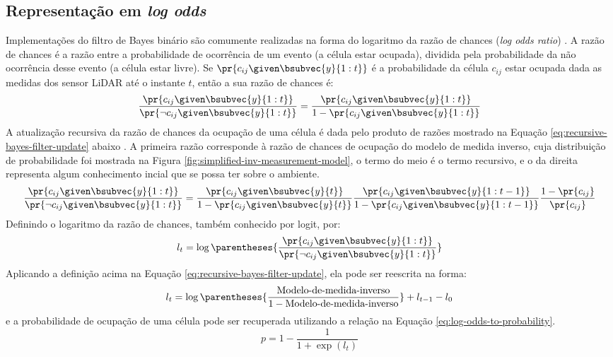 \subsection{Representação em \textit{log odds}}
Implementações do filtro de Bayes binário são comumente realizadas na 
forma do logaritmo da razão de chances (\textit{log odds ratio}) \cite[p.~94]{thrun2005probabilistic}. A razão de chances é a 
razão entre a probabilidade de ocorrência de um evento (a célula 
estar ocupada), dividida pela probabilidade da não ocorrência desse evento (a 
célula estar livre). Se $\pr{c_{ij} \given \bsubvec{y}{1:t}}$ é a probabilidade da célula $c_{ij}$ 
estar ocupada dada as medidas dos sensor LiDAR até o instante $t$, então a sua razão de chances é:
\begin{equation}
  \frac{\pr{c_{ij}\given \bsubvec{y}{1:t}}}{\pr{\neg c_{ij}\given \bsubvec{y}{1:t}}} = \frac{\pr{c_{ij}\given \bsubvec{y}{1:t}}}{1 - \pr{c_{ij}\given \bsubvec{y}{1:t}}}
\end{equation}
A atualização recursiva da razão de chances da ocupação de uma célula é 
dada pelo produto de razões mostrado na Equação \ref{eq:recursive-bayes-filter-update} abaixo \cite[p.~96]{thrun2005probabilistic}. A primeira razão corresponde à razão de 
chances de ocupação do modelo de medida inverso, cuja distribuição de 
probabilidade foi mostrada na Figura \ref{fig:simplified-inv-measurement-model}, o termo do meio é o termo 
recursivo, e o da direita representa algum conhecimento incial que se 
possa ter sobre o ambiente.
\begin{equation}
  \frac{\pr{c_{ij}\given \bsubvec{y}{1:t}}}{\pr{\neg c_{ij}\given \bsubvec{y}{1:t}}} = \frac{\pr{c_{ij}\given \bsubvec{y}{t}}}{1 - \pr{c_{ij}\given \bsubvec{y}{t}}} \frac{\pr{c_{ij}\given \bsubvec{y}{1:t-1}}}{1 - \pr{c_{ij}\given \bsubvec{y}{1:t-1}}} \frac{1 - \pr{c_{ij}}}{\pr{c_{ij}}}
  \label{eq:recursive-bayes-filter-update}
\end{equation}
Definindo o logaritmo da razão de chances, também conhecido por logit, por:
\begin{equation}
  l_{t} = \log\parentheses{\frac{\pr{c_{ij}\given \bsubvec{y}{1:t}}}{\pr{\neg c_{ij}\given \bsubvec{y}{1:t}}}}
\end{equation}
Aplicando a definição acima na 
Equação \ref{eq:recursive-bayes-filter-update}, ela pode ser reescrita 
na forma:
\begin{equation}
  l_t = \log\parentheses{\frac{\text{Modelo-de-medida-inverso}}{1 - \text{Modelo-de-medida-inverso}}} + l_{t-1} - l_0
  \label{eq:occupancy-grid-log-odds}
\end{equation}
e a probabilidade de ocupação de uma célula pode ser recuperada 
utilizando a relação na Equação \ref{eq:log-odds-to-probability}.
\begin{equation}
  p = 1 - \frac{1}{1 + \exp({l_t})}
  \label{eq:log-odds-to-probability}
\end{equation}

